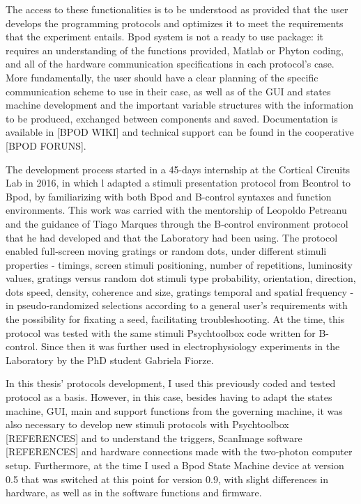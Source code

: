 The access to these functionalities is to be understood as provided that the user develops the programming protocols and optimizes it to meet the requirements that the experiment entails. Bpod system is not a ready to use package: it requires an understanding of the functions provided, Matlab or Phyton coding, and all of the hardware communication specifications in each protocol's case. More fundamentally, the user should have a clear planning of the specific communication scheme to use in their case, as well as of the GUI and states machine development and the important variable structures with the information to be produced, exchanged between components and saved. Documentation is available in [BPOD WIKI] and technical support can be found in the cooperative [BPOD FORUNS].

The development process started in a 45-days internship at the Cortical Circuits Lab in 2016, in which l adapted a stimuli presentation protocol from Bcontrol to Bpod, by familiarizing with both Bpod and B-control syntaxes and function environments. This work was carried with the mentorship of Leopoldo Petreanu and the guidance of Tiago Marques through the B-control environment protocol that he had developed and that the Laboratory had been using. The protocol enabled full-screen moving gratings or random dots, under different stimuli properties - timings, screen stimuli positioning, number of repetitions, luminosity values, gratings versus random dot stimuli type probability, orientation, direction, dots speed, density, coherence and size, gratings temporal and spatial frequency - in pseudo-randomized selections according to a general user's requirements with the possibility for fixating a seed, facilitating troubleshooting. At the time, this protocol was tested with the same stimuli Psychtoolbox code written for B-control. Since then it was further used in electrophysiology experiments in the Laboratory by the PhD student Gabriela Fiorze.

In this thesis' protocols development, I used  this previously coded and tested protocol as a basis. However, in this case, besides having to adapt the states machine, GUI, main and support functions from the governing machine, it was also necessary to develop new stimuli protocols with Psychtoolbox [REFERENCES] and to understand the triggers, ScanImage software [REFERENCES] and hardware connections made with the two-photon computer setup. Furthermore, at the time I used a Bpod State Machine device at version 0.5 that was switched at this point for version 0.9, with slight differences in hardware, as well as in the software functions and firmware.


